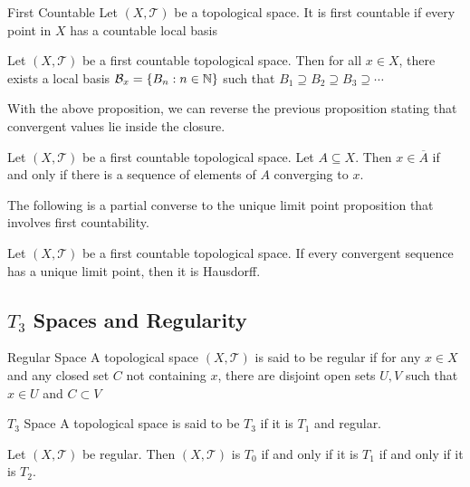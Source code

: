 \documentclass[a4paper]{article}
\begin{document}
\begin{defn}{First Countable}{} Let $(X,\mathcal{T})$ be a topological space. It is first countable if every point in $X$ has a countable local basis
\end{defn}

\begin{prp}{}{} Let $(X,\mathcal{T})$ be a first countable topological space. Then for all $x\in X$, there exists a local basis $\mathcal{B}_x=\{B_n:n\in\mathbb{N}\}$ such that $B_1\supseteq B_2\supseteq B_3\supseteq\cdots$
\end{prp}

With the above proposition, we can reverse the previous proposition stating that convergent values lie inside the closure. 

\begin{prp}{}{} Let $(X,\mathcal{T})$ be a first countable topological space. Let $A\subseteq X$. Then $x\in\overline{A}$ if and only if there is a sequence of elements of $A$ converging to $x$. 
\end{prp}

The following is a partial converse to the unique limit point proposition that involves first countability. 


\begin{prp}{}{} Let $(X,\mathcal{T})$ be a first countable topological space. If every convergent sequence has a unique limit point, then it is Hausdorff. 
\end{prp}

\subsection{$T_3$ Spaces and Regularity}
\begin{defn}{Regular Space}{} A topological space $(X,\mathcal{T})$ is said to be regular if for any $x\in X$ and any closed set $C$ not containing $x$, there are disjoint open sets $U,V$ such that $x\in U$ and $C\subset V$
\end{defn}

\begin{defn}{$T_3$ Space}{} A topological space is said to be $T_3$ if it is $T_1$ and regular. 
\end{defn}

\begin{prp}{}{} Let $(X,\mathcal{T})$ be regular. Then $(X,\mathcal{T})$ is $T_0$ if and only if it is $T_1$ if and only if it is $T_2$. 
\end{prp}
\end{document}

